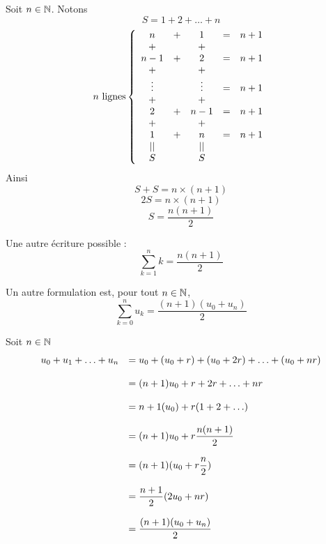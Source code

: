 \begin{preuve}
Soit $n\in\mathbb{N}$. Notons 
$$S = 1 + 2 + \ldots + n$$
$$n\text{ lignes} \left\{
\begin{array}{c c c c c}
n & + & 1 & = & n+1\\
+ &    & + &    &\\
n-1 & + & 2 & = & n+1\\
+ &    & + &    &\\
\vdots &  & \vdots & = & n+1\\
+ &    & + &    &\\
2 & + & n-1 & = & n+1\\
+ &    & + &    &\\
1 & + & n & = & n+1\\
|| &    & || &    &\\
S &    & S &&\\
\end{array}
\right.
$$
Ainsi 
$$S+S = n \times (n+1)$$
$$2S = n\times (n+1)$$
$$S = \dfrac{n(n+1)}{2}$$
\end{preuve}
\begin{remarque}
Une autre écriture possible : 
$$\sum_{k=1}^n k = \dfrac{n(n+1)}{2}$$
\end{remarque}
\newline

\begin{remarque}
Un autre formulation est, pour tout $n\in\mathbb{N}$, 
$$\sum_{k=0}^n u_k =  \dfrac{(n+1)(u_0 + u_n)}{2}$$
\end{remarque}
\begin{preuve}
Soit $n\in\mathbb{N}$
$$\begin{array}{l l}
u_0 + u_1 + \ldots + u_n & = u_0 + (u_0 + r) + (u_0 + 2r) + \ldots + (u_0 + nr)\\ \\
&= (n+1)u_0 + r + 2r + \ldots + nr\\ \\
&= n+1(u_0) + r(1+2+\ldots)\\ \\
&= (n+1)u_0 + r \dfrac{n(n+1)}{2}\\ \\
& = (n+1)(u_0 + r\dfrac{n}{2})\\ \\
& = \dfrac{n+1}{2}(2u_0 + nr)\\ \\
& = \dfrac{(n+1)(u_0 + u_n)}{2}\\
\end{array}$$
\end{preuve}

